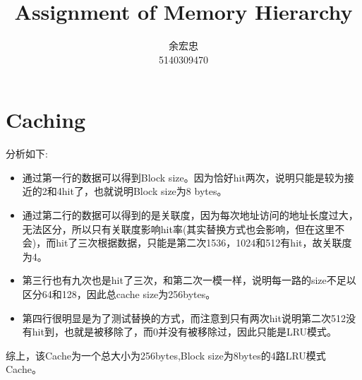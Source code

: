 \documentclass[a4paper,11pt]{article}
\author{余宏忠 \\ 5140309470}
\title{Assignment of Memory Hierarchy}
\begin{document}
	\maketitle
\section{Caching}
分析如下:
\begin{itemize}
\item 通过第一行的数据可以得到Block size。因为恰好hit两次，说明只能是较为接近的2和4hit了，也就说明Block size为8 bytes。
\item 通过第二行的数据可以得到的是关联度，因为每次地址访问的地址长度过大，无法区分，所以只有关联度影响hit率(其实替换方式也会影响，但在这里不会)，而hit了三次根据数据，只能是第二次1536，1024和512有hit，故关联度为4。
\item 第三行也有九次也是hit了三次，和第二次一模一样，说明每一路的size不足以区分64和128，因此总cache size为256bytes。
\item 第四行很明显是为了测试替换的方式，而注意到只有两次hit说明第二次512没有hit到，也就是被移除了，而0并没有被移除过，因此只能是LRU模式。
\end{itemize} 
综上，该Cache为一个总大小为256bytes,Block size为8bytes的4路LRU模式Cache。
\end{document}

